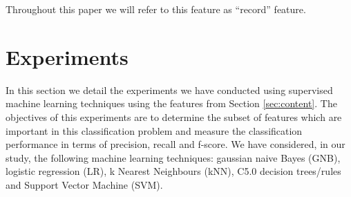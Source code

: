 Throughout this paper we will refer to this feature as ``record'' feature.





\section{Experiments}\label{sec:exp}


In this section we detail the experiments we have conducted using supervised
machine learning techniques using the features from Section \ref{sec:content}.
The objectives of this experiments are to determine the subset of features which
are important in this classification problem and measure the classification
performance in terms of precision, recall and f-score.
We have considered, in our study, the following machine learning techniques:
gaussian naive Bayes (GNB), logistic regression (LR), k Nearest Neighbours
(kNN), C5.0 decision trees/rules and Support Vector Machine (SVM).

